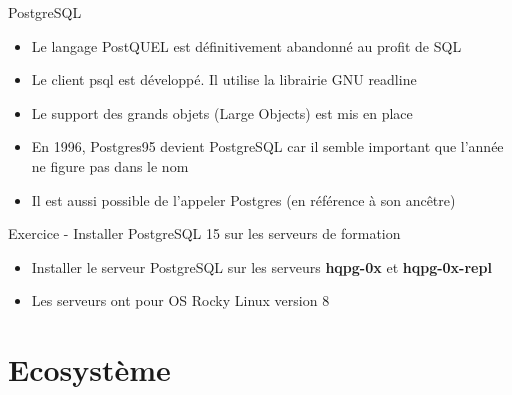 
\begin{frame}[fragile]{PostgreSQL}

   \begin{itemize}
      \item Le langage PostQUEL est définitivement abandonné au profit de SQL
      \item Le client psql est développé. Il utilise la librairie GNU readline
      \item Le support des grands objets (Large Objects) est mis en place
      \item En 1996, Postgres95 devient PostgreSQL car il semble important que l'année ne figure pas dans le nom
      \item Il est aussi possible de l'appeler Postgres (en référence à son ancêtre)
   \end{itemize}

\end{frame}


\begin{frame}[fragile]{Exercice - Installer PostgreSQL 15 sur les serveurs de formation}

   \begin{itemize}
      \item Installer le serveur PostgreSQL sur les serveurs \textbf{hqpg-0x} et \textbf{hqpg-0x-repl}
      \item Les serveurs ont pour OS Rocky Linux version 8
   \end{itemize}

\begin{toile}
\end{toile}

\end{frame}


\section{Ecosystème}

